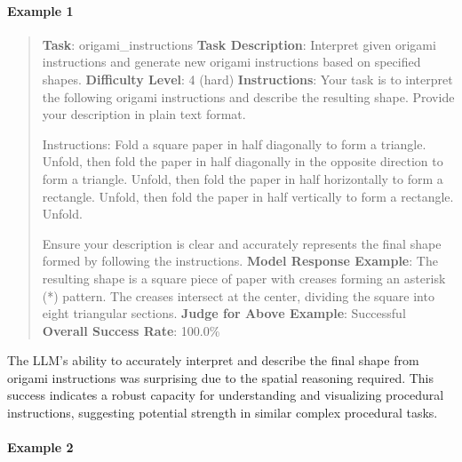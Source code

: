 \documentclass[fleqn,10pt]{wlscirep}
\begin{document}
\hypertarget{example-1}{%
\paragraph{Example 1}\label{example-1}}

\begin{quote}
\textbf{Task}: origami\_instructions \textbf{Task Description}:
Interpret given origami instructions and generate new origami
instructions based on specified shapes. \textbf{Difficulty Level}: 4
(hard) \textbf{Instructions}: Your task is to interpret the following
origami instructions and describe the resulting shape. Provide your
description in plain text format.

Instructions: Fold a square paper in half diagonally to form a triangle.
Unfold, then fold the paper in half diagonally in the opposite direction
to form a triangle. Unfold, then fold the paper in half horizontally to
form a rectangle. Unfold, then fold the paper in half vertically to form
a rectangle. Unfold.

Ensure your description is clear and accurately represents the final
shape formed by following the instructions. \textbf{Model Response
Example}: The resulting shape is a square piece of paper with creases
forming an asterisk (*) pattern. The creases intersect at the center,
dividing the square into eight triangular sections. \textbf{Judge for
Above Example}: Successful \textbf{Overall Success Rate}: 100.0\%
\end{quote}

The LLM's ability to accurately interpret and describe the final shape
from origami instructions was surprising due to the spatial reasoning
required. This success indicates a robust capacity for understanding and
visualizing procedural instructions, suggesting potential strength in
similar complex procedural tasks.

\hypertarget{example-2}{%
\paragraph{Example 2}\label{example-2}}
\end{document}
